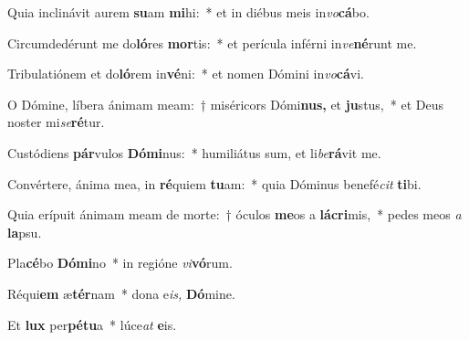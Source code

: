 \item Quia inclinávit aurem \textbf{su}am \textbf{mi}hi:~* et in diébus meis in\textit{vo}\textbf{cá}bo.
\item Circumdedérunt me do\textbf{ló}res \textbf{mor}tis:~* et perícula inférni in\textit{ve}\textbf{né}runt me.
\item Tribulatiónem et do\textbf{ló}rem in\textbf{vé}ni:~* et nomen Dómini in\textit{vo}\textbf{cá}vi.
\item O Dómine, líbera ánimam meam:~† miséricors Dómi\textbf{nus,} et \textbf{ju}stus,~* et Deus noster mi\hspace*{0.03em}\textit{se}\textbf{ré}tur.
\item Custódiens \textbf{pár}vulos \textbf{Dó}\textbf{mi}nus:~* humiliátus sum, et li\textit{be}\textbf{rá}vit me.
\item Convértere, ánima mea, in \textbf{ré}quiem \textbf{tu}am:~* quia Dóminus benefé\hspace*{0.03em}\textit{cit} \textbf{ti}bi.
\item Quia erípuit ánimam meam de morte:~† óculos \textbf{me}os a \textbf{lá}\textbf{cri}mis,~* pedes meos \textit{a} \textbf{la}psu.
\item Pla\textbf{cé}bo \textbf{Dó}\textbf{mi}no~* in regióne \textit{vi}\textbf{vó}rum.
\item Réqui\textbf{em} æ\textbf{tér}nam~* dona e\textit{is,} \textbf{Dó}mine.
\item Et \textbf{lux} per\textbf{pé}\textbf{tu}a~* lúce\hspace*{0.03em}\textit{at} \textbf{e}is.
